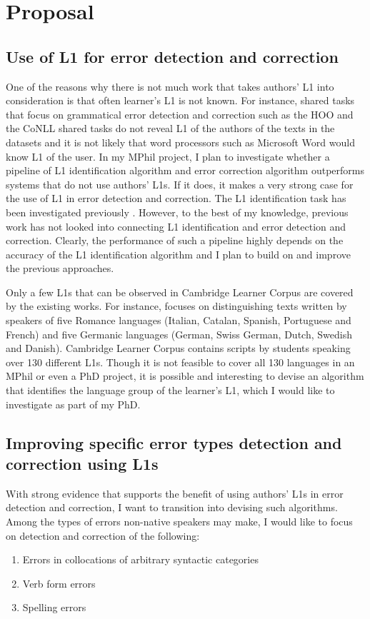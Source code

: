 \documentclass[11pt]{article}
\begin{document}
\section{Proposal}
\subsection{Use of L1 for error detection and correction}
\label{sub:experiment}
One of the reasons why there is not much work that takes authors' L1 into 
consideration is that often learner's L1 is not known. For instance, 
shared tasks that focus on grammatical error detection and correction such as 
the HOO and the CoNLL shared tasks do not reveal L1 of the authors 
of the texts in the datasets and it is not likely that word processors such as 
Microsoft Word would know L1 of the user. In my MPhil project, I plan to 
investigate whether a pipeline of L1 identification algorithm and error 
correction algorithm outperforms systems that do not use authors' L1s. If it 
does, it makes a very strong case for the use of L1 in error detection and 
correction. The L1 identification task has been investigated previously \citep{estival2007author, tomokiyo2001you, koppel2005determining, 
koppel2005automatically, wong2009contrastive, kochmar2011identification}. 
However, to the best of my knowledge, previous work has not looked into connecting L1 identification and error detection and correction. Clearly, the performance of such 
a pipeline highly depends on the accuracy of the L1 identification algorithm and 
I plan to build on and improve the previous approaches.

Only a few L1s that can be observed in Cambridge Learner Corpus are covered by 
the existing works. For instance, \cite{kochmar2011identification} focuses on 
distinguishing texts written by speakers of five Romance languages (Italian, Catalan, 
Spanish, Portuguese and French) and five Germanic languages (German, Swiss 
German, Dutch, Swedish and Danish). Cambridge Learner Corpus contains scripts by 
students speaking over 130 different L1s. Though it is not 
feasible to cover all 130 languages in an MPhil or even a PhD project, it is 
possible and interesting to devise an algorithm that identifies the language 
group of the learner's L1, which I would like to investigate as part of my 
PhD.

\subsection{Improving specific error types detection and correction using L1s
	}
With strong evidence that supports the benefit of using authors' L1s in error 
detection and correction, I want to transition into devising such algorithms.
Among the types of errors non-native speakers may make, I would like to focus on 
detection and correction of the following:
\begin{enumerate}
\item Errors in collocations of arbitrary syntactic categories\label{error:1}
\item Verb form errors \label{error:2}
\item Spelling errors \label{error:3}
\end{enumerate}
\end{document}
